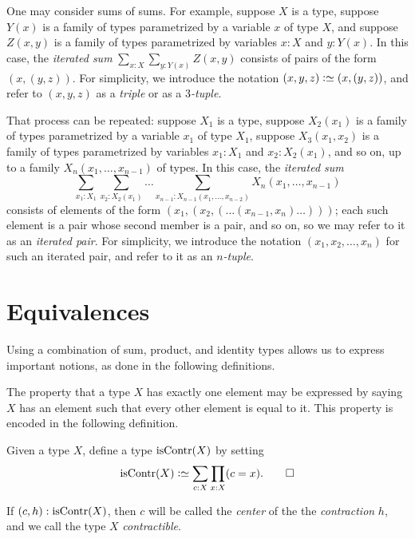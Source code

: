 \begin{remark}
  \label{iterated-sums}
  One may consider sums of sums.  For example, suppose $X$ is a type, suppose $Y(x)$ is a family of types parametrized by a variable $x$ of type $X$,
  and suppose $Z(x,y)$ is a family of types parametrized by variables $x:X$ and $y:Y(x)$.  In this case, the \emph{iterated sum}
  $\sum _{x:X} \sum_{y:Y(x)} Z(x,y)$ consists of pairs of the form $(x,(y,z))$.  For simplicity, we introduce the notation
  $(x,y,z) \defeq (x,(y,z))$, and refer to $(x,y,z)$ as a \emph{triple} or as a \emph{$3$-tuple}.

  That process can be repeated: suppose $X_1$ is a type, suppose $X_2(x_1)$ is a family of types parametrized by a variable $x_1$ of type $X_1$,
  suppose $X_3(x_1,x_2)$ is a family of types parametrized by variables $x_1:X_1$ and $x_2:X_2(x_1)$, and so on, up to a family
  $X_n(x_1,\dots,x_{n-1})$ of types.  In this case, the \emph{iterated sum}
  $$\sum _{x_1:X_1} \sum_{x_2:X_2(x_1)} \dots \sum_{x_{n-1}:X_{n-1}(x_1,\dots,x_{n-2})} X_n(x_1,\dots,x_{n-1}) $$
  consists of elements of the form
  $(x_1,(x_2,(\dots (x_{n-1},x_n)\dots)))$; each such element is a pair whose second member is a pair, and so on, so we may refer to it as an \emph{iterated pair}.
  For simplicity, we introduce the notation $(x_1,x_2,\dots,x_n)$ for such an iterated pair, and refer to it as an \emph{$n$-tuple}.
\end{remark}

\section{Equivalences}\label{sec:equivalence}

Using a combination of sum, product, and identity types allows
us to express important notions, as done in the following
definitions.

The property that a type $X$ has exactly one element may be expressed by saying $X$ has an element such that every other element is equal to it.
This property is encoded in the following definition.

\begin{definition}
  \label{def:contractible}
  Given a type $X$, define a type $\iscontr(X)$ by setting
  \[
    \iscontr(X) \defeq \sum_{c:X} \prod_{x:X} (c=x).\qedhere
  \]
\end{definition}

If $ (c,h) : \iscontr(X) $, then $c$ will be called the \emph{center} of the
the \emph{contraction} $h$, and we call the type $X$ \emph{contractible}.

